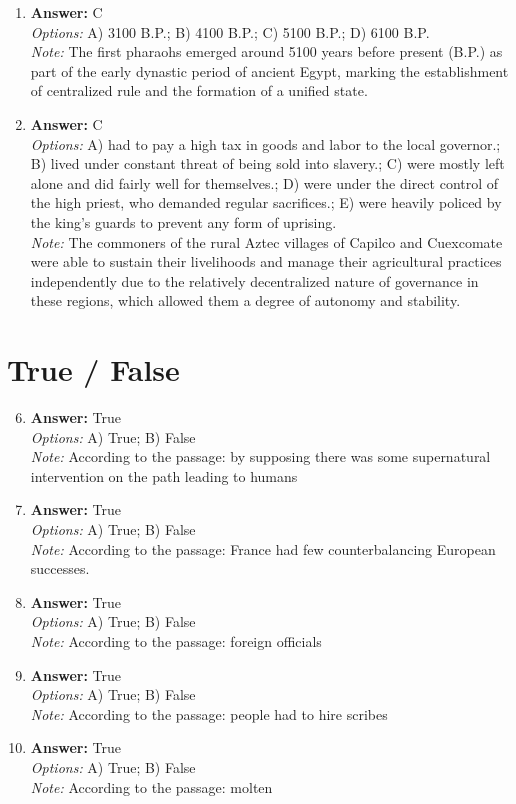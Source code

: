 \documentclass[12pt]{article}
\begin{document}
\begin{enumerate}[label=\arabic*.]
\item \textbf{Answer:} C
\\ \textit{Options:} A) 3100 B.P.; B) 4100 B.P.; C) 5100 B.P.; D) 6100 B.P.
\\ \textit{Note:} The first pharaohs emerged around 5100 years before present (B.P.) as part of the early dynastic period of ancient Egypt, marking the establishment of centralized rule and the formation of a unified state.
\item \textbf{Answer:} C
\\ \textit{Options:} A) had to pay a high tax in goods and labor to the local governor.; B) lived under constant threat of being sold into slavery.; C) were mostly left alone and did fairly well for themselves.; D) were under the direct control of the high priest, who demanded regular sacrifices.; E) were heavily policed by the king's guards to prevent any form of uprising.
\\ \textit{Note:} The commoners of the rural Aztec villages of Capilco and Cuexcomate were able to sustain their livelihoods and manage their agricultural practices independently due to the relatively decentralized nature of governance in these regions, which allowed them a degree of autonomy and stability.
\end{enumerate}

\section*{True / False}
\begin{enumerate}[label=\arabic*.]
\setcounter{enumi}{5}
\item \textbf{Answer:} True
\\ \textit{Options:} A) True; B) False
\\ \textit{Note:} According to the passage: by supposing there was some supernatural intervention on the path leading to humans
\item \textbf{Answer:} True
\\ \textit{Options:} A) True; B) False
\\ \textit{Note:} According to the passage: France had few counterbalancing European successes.
\item \textbf{Answer:} True
\\ \textit{Options:} A) True; B) False
\\ \textit{Note:} According to the passage: foreign officials
\item \textbf{Answer:} True
\\ \textit{Options:} A) True; B) False
\\ \textit{Note:} According to the passage: people had to hire scribes
\item \textbf{Answer:} True
\\ \textit{Options:} A) True; B) False
\\ \textit{Note:} According to the passage: molten
\end{enumerate}
\end{document}
